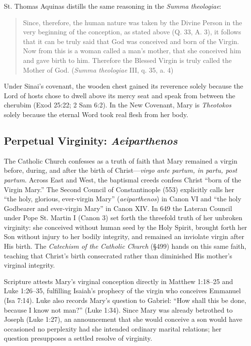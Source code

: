 St. Thomas Aquinas distills the same reasoning in the \textit{Summa theologiae}:

\begin{quote}\small
Since, therefore, the human nature was taken by the Divine Person in the very beginning of the conception, as stated above (Q. 33, A. 3), it follows that it can be truly said that God was conceived and born of the Virgin. Now from this is a woman called a man's mother, that she conceived him and gave birth to him. Therefore the Blessed Virgin is truly called the Mother of God. (\textit{Summa theologiae} III, q. 35, a. 4)
\end{quote}

Under Sinai's covenant, the wooden chest gained its reverence solely because the Lord of hosts chose to dwell above its mercy seat and speak from between the cherubim (Exod 25:22; 2 Sam 6:2). In the New Covenant, Mary is \textit{Theotokos} solely because the eternal Word took real flesh from her body.

\subsection{Perpetual Virginity: \textit{Aeiparthenos}}\label{subsec:aeiparthenos}

The Catholic Church confesses as a truth of faith that Mary remained a virgin before, during, and after the birth of Christ---\textit{virgo ante partum, in partu, post partum}. Across East and West, the baptismal creeds confess Christ ``born of the Virgin Mary.'' The Second Council of Constantinople (553) explicitly calls her ``the holy, glorious, ever-virgin Mary'' (\textit{aeiparthenos}) in Canon VI and ``the holy Godbearer and ever-virgin Mary'' in Canon XIV. In 649 the Lateran Council under Pope St. Martin I (Canon 3) set forth the threefold truth of her unbroken virginity: she conceived without human seed by the Holy Spirit, brought forth her Son without injury to her bodily integrity, and remained an inviolate virgin after His birth. The \textit{Catechism of the Catholic Church} (\S 499) hands on this same faith, teaching that Christ's birth consecrated rather than diminished His mother's virginal integrity.

Scripture attests Mary's virginal conception directly in Matthew 1:18--25 and Luke 1:26--35, fulfilling Isaiah's prophecy of the virgin who conceives Emmanuel (Isa 7:14). Luke also records Mary's question to Gabriel: ``How shall this be done, because I know not man?'' (Luke 1:34). Since Mary was already betrothed to Joseph (Luke 1:27), an announcement that she would conceive a son would have occasioned no perplexity had she intended ordinary marital relations; her question presupposes a settled resolve of virginity.

